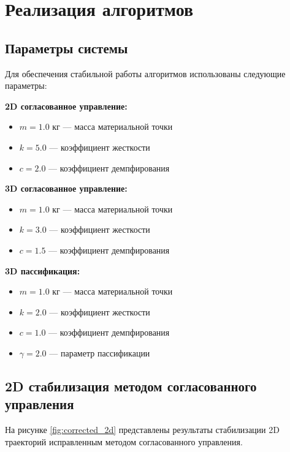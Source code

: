 \section{Реализация алгоритмов}

\subsection{Параметры системы}

Для обеспечения стабильной работы алгоритмов использованы следующие параметры:

\textbf{2D согласованное управление:}
\begin{itemize}
\item $m = 1.0$ кг --- масса материальной точки
\item $k = 5.0$ --- коэффициент жесткости
\item $c = 2.0$ --- коэффициент демпфирования
\end{itemize}

\textbf{3D согласованное управление:}
\begin{itemize}
\item $m = 1.0$ кг --- масса материальной точки
\item $k = 3.0$ --- коэффициент жесткости
\item $c = 1.5$ --- коэффициент демпфирования
\end{itemize}

\textbf{3D пассификация:}
\begin{itemize}
\item $m = 1.0$ кг --- масса материальной точки
\item $k = 2.0$ --- коэффициент жесткости
\item $c = 1.0$ --- коэффициент демпфирования
\item $\gamma = 2.0$ --- параметр пассификации
\end{itemize}

\subsection{2D стабилизация методом согласованного управления}

На рисунке \ref{fig:corrected_2d} представлены результаты стабилизации 2D траекторий исправленным методом согласованного управления.

